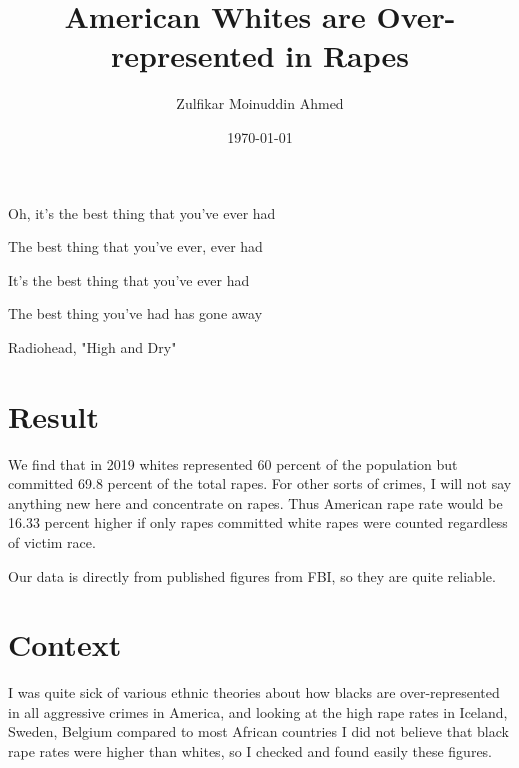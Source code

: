 \documentclass{amsart}
\title{American Whites are Over-represented in Rapes}
\author{Zulfikar Moinuddin Ahmed}
\date{\today}
\begin{document}
\maketitle
\epigraph{Oh, it's the best thing that you've ever had

The best thing that you've ever, ever had

It's the best thing that you've ever had

The best thing you've had has gone away}{Radiohead, "High and Dry"}

\section{Result}

We find that in 2019 whites represented 60 percent of the population but committed 69.8 percent of the total rapes.  For other sorts of crimes, I will not say anything new here and concentrate on rapes.  Thus American rape rate would be 16.33 percent higher if only rapes committed white rapes were counted regardless of victim race.

Our data is directly from published figures from FBI, so they are quite reliable.

\section{Context}

I was quite sick of various ethnic theories about how blacks are over-represented in all aggressive crimes in America, and looking at the high rape rates in Iceland, Sweden, Belgium compared to most African countries I did not believe that black rape rates were higher than whites, so I checked and found easily these figures.  

\begin{thebibliography}{CCC}
\end{thebibliography}
\end{document}
